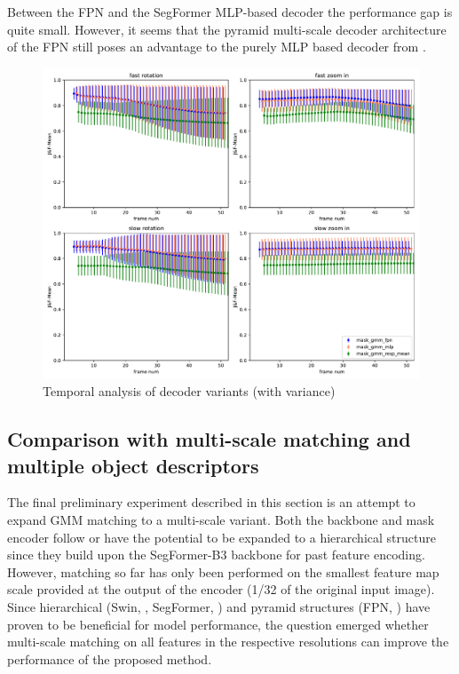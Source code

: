 
Between the FPN and the SegFormer MLP-based decoder the performance gap is quite small. However, it seems that the pyramid multi-scale decoder architecture of the FPN still poses an advantage to the purely MLP based decoder from \parencite{segformer}.
\vspace{10mm}
\begin{figure}[ht!]
    \centering
    \includegraphics[width=1.\linewidth]{figures/04_experiments/decoder_ablations/mask_gmm_fpn-mask_gmm_mlp-mask_gmm_resp_mean-movement_all_variance.pdf}
    \caption{Temporal analysis of decoder variants (with variance)}
    \label{fig:decoder_abl_all_variance}
    
\end{figure}
\clearpage

\subsection{Comparison with multi-scale matching and multiple object descriptors}

The final preliminary experiment described in this section is an attempt to expand GMM matching to a  multi-scale variant. Both the backbone and mask encoder follow or have the potential to be expanded to a hierarchical structure since they build upon the SegFormer-B3 backbone for past feature encoding. However, matching so far has only been performed on the smallest feature map scale provided at the output of the encoder (1/32 of the original input image). Since hierarchical (Swin, \cite{swin}, SegFormer, \cite{segformer}) and pyramid structures (FPN, \cite{fpn}) have proven to be beneficial for model performance, the question emerged whether multi-scale matching on all features in the respective resolutions can improve the performance of the proposed method. \par

